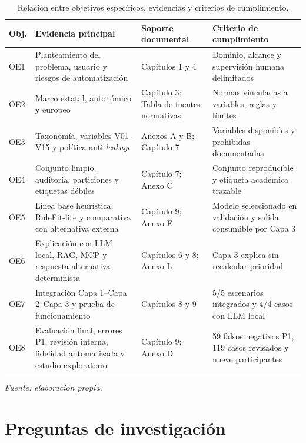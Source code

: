 \begin{table}[htbp]
\centering
\scriptsize
\setlength{\tabcolsep}{3pt}
\begin{tabular}{|p{1.1cm}|p{4.4cm}|p{4.9cm}|p{3.2cm}|}
\hline
\textbf{Obj.} & \textbf{Evidencia principal} & \textbf{Soporte documental} & \textbf{Criterio de cumplimiento} \\ \hline
OE1 & Planteamiento del problema, usuario y riesgos de automatización & Capítulos 1 y 4 & Dominio, alcance y supervisión humana delimitados \\ \hline
OE2 & Marco estatal, autonómico y europeo & Capítulo 3; Tabla de fuentes normativas & Normas vinculadas a variables, reglas y límites \\ \hline
OE3 & Taxonomía, variables V01--V15 y política anti-\textit{leakage} & Anexos A y B; Capítulo 7 & Variables disponibles y prohibidas documentadas \\ \hline
OE4 & Conjunto limpio, auditoría, particiones y etiquetas débiles & Capítulo 7; Anexo C & Conjunto reproducible y etiqueta académica trazable \\ \hline
OE5 & Línea base heurística, RuleFit-lite y comparativa con alternativa externa & Capítulo 9; Anexo E & Modelo seleccionado en validación y salida consumible por Capa 3 \\ \hline
OE6 & Explicación con LLM local, RAG, MCP y respuesta alternativa determinista & Capítulos 6 y 8; Anexo L & Capa 3 explica sin recalcular prioridad \\ \hline
OE7 & Integración Capa 1--Capa 2--Capa 3 y prueba de funcionamiento & Capítulos 8 y 9 & 5/5 escenarios integrados y 4/4 casos con LLM local \\ \hline
OE8 & Evaluación final, errores P1, revisión interna, fidelidad automatizada y estudio exploratorio & Capítulo 9; Anexo D & 59 falsos negativos P1, 119 casos revisados y nueve participantes \\ \hline
\end{tabular}
\caption{Relación entre objetivos específicos, evidencias y criterios de cumplimiento.}
\label{tab:objetivos-evidencias-cumplimiento}
\smallskip
{\small\textit{Fuente: elaboración propia.}\par}
\end{table}

\section{Preguntas de investigación}

